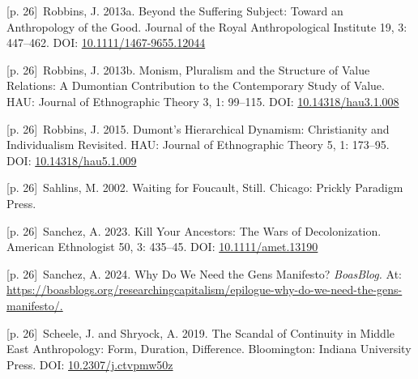 \documentclass[10pt,a4paper]{article}
\begin{document}
\noindent\begin{minipage}[t]{\linewidth}{\scriptsize\color{gray} [p. 26]}\ Robbins, J. 2013a. Beyond the Suffering Subject: Toward an Anthropology of the Good. Journal of the Royal Anthropological Institute 19, 3: 447–462. DOI: \url{10.1111/1467-9655.12044}\par\end{minipage}\par
\noindent\begin{minipage}[t]{\linewidth}{\scriptsize\color{gray} [p. 26]}\ Robbins, J. 2013b. Monism, Pluralism and the Structure of Value Relations: A Dumontian Contribution to the Contemporary Study of Value. HAU: Journal of Ethnographic Theory 3, 1: 99–115. DOI: \url{10.14318/hau3.1.008}\par\end{minipage}\par
\noindent\begin{minipage}[t]{\linewidth}{\scriptsize\color{gray} [p. 26]}\ Robbins, J. 2015. Dumont’s Hierarchical Dynamism: Christianity and Individualism Revisited. HAU: Journal of Ethnographic Theory 5, 1: 173–95. DOI: \url{10.14318/hau5.1.009}\par\end{minipage}\par
\noindent\begin{minipage}[t]{\linewidth}{\scriptsize\color{gray} [p. 26]}\ Sahlins, M. 2002. Waiting for Foucault, Still. Chicago: Prickly Paradigm Press.\par\end{minipage}\par
\noindent\begin{minipage}[t]{\linewidth}{\scriptsize\color{gray} [p. 26]}\ Sanchez, A. 2023. Kill Your Ancestors: The Wars of Decolonization. American Ethnologist 50, 3: 435–45. DOI: \url{10.1111/amet.13190}\par\end{minipage}\par
\noindent\begin{minipage}[t]{\linewidth}{\scriptsize\color{gray} [p. 26]}\ Sanchez, A. 2024. Why Do We Need the Gens Manifesto? \textit{BoasBlog.} At: \url{https://boasblogs.org/researchingcapitalism/epilogue-why-do-we-need-the-gens-manifesto/.}\par\end{minipage}\par
\noindent\begin{minipage}[t]{\linewidth}{\scriptsize\color{gray} [p. 26]}\ Scheele, J. and Shryock, A. 2019. The Scandal of Continuity in Middle East Anthropology: Form, Duration, Difference. Bloomington: Indiana University Press. DOI: \url{10.2307/j.ctvpmw50z}\par\end{minipage}\par
\end{document}
